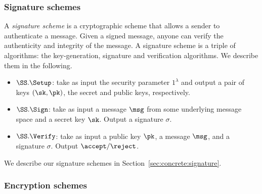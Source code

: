 

\subsubsection{Signature schemes}

A \emph{signature scheme} is a cryptographic scheme that allows a sender to authenticate a message. Given a signed message, anyone can verify the authenticity and integrity of the message. A signature scheme is a triple of algorithms: the key-generation, signature  and verification algorithms. We describe them in the following.

\begin{itemize}
	\item $\SS.\Setup$: take as input the security parameter $1^{\lambda}$ and output a pair of keys $(\sk, \pk)$, the secret and public keys, respectively.
	\item ${\SS.\Sign}$: take as input a message $\msg$ from some underlying message space and a secret key $\sk$. Output a signature $\sigma$.%
	\item ${\SS.\Verify}$: take as input a public key
	$\pk$, a message $\msg$, and a signature $\sigma$. Output $\accept/\reject$.%
\end{itemize}

We describe our signature schemes in Section~\ref{sec:concrete:signature}.

\subsubsection{Encryption schemes}

